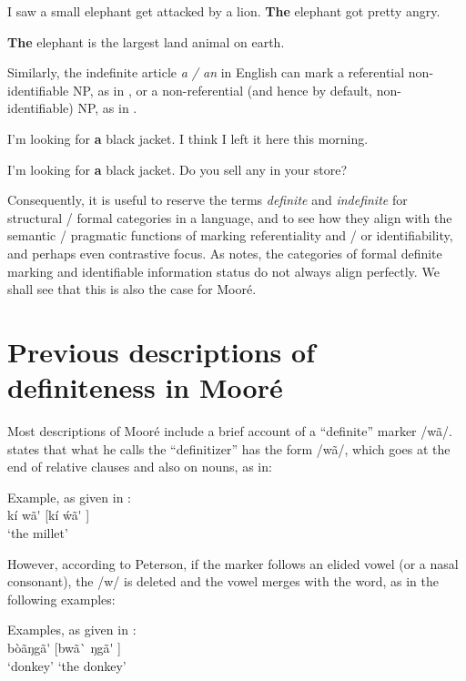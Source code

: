 \documentclass[output=paper]{langsci/langscibook}
\begin{document}
\ea\label{ex:teo:6}
I saw a small elephant get attacked by a lion. \textbf{The} elephant got pretty angry.
\z

\ea\label{ex:teo:7}
\textbf{The} elephant is the largest land animal on earth.
\z

Similarly, the indefinite article \textit{a / an} in English can mark a referential non-identifiable NP, as in , or a non-referential (and hence by default, non-identifiable) NP, as in .

\ea\label{ex:teo:8}
I’m looking for \textbf{a} black jacket. I think I left it here this morning. 
\z

\ea\label{ex:teo:9}
I’m looking for \textbf{a} black jacket. Do you sell any in your store? 
\z

Consequently, it is useful to reserve the terms \textit{definite} and \textit{indefinite} for structural / formal categories in a language, and to see how they align with the semantic / pragmatic functions of marking referentiality and / or identifiability, and perhaps even contrastive focus. As \citet[79]{Lambrecht1994} notes, the categories of formal definite marking and identifiable information status do not always align perfectly. We shall see that this is also the case for Mooré.

\section{Previous descriptions of definiteness in Mooré}\label{sec:teo:3}

Most descriptions of Mooré include a brief account of a “definite” marker /wã/. \citet[77]{Peterson1971} states that what he calls the “definitizer” has the form /wã/, which goes at the end of relative clauses and also on nouns, as in:

\ea\label{ex:teo:10}
Example, as given in \citet[77]{Peterson1971}:\\
 kí wã\'{}  [kí \'{w}ã\'{} ]\\
‘the millet’
\z

However, according to Peterson, if the marker follows an elided vowel (or a nasal consonant), the /w/ is deleted and the vowel merges with the word, as in the following examples:

\ea\label{ex:teo:11}
Examples, as given in \citet[77]{Peterson1971}:\\
  bòãŋgã\'{}  [bwã\`{} ŋgã\'{} ] \\
{‘donkey’}  {‘the donkey’} \\
\end{document}
